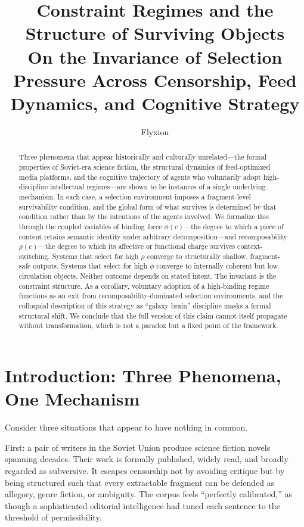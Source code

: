 \documentclass[12pt]{article}
\title{Constraint Regimes and the Structure of Surviving Objects\\
\large On the Invariance of Selection Pressure Across Censorship, Feed Dynamics, and Cognitive Strategy}
\author{Flyxion}
\date{}
\newcommand{\bind}{\phi}
\newcommand{\recomp}{\rho}
\begin{document}
\maketitle

\begin{abstract}
Three phenomena that appear historically and culturally unrelated—the formal
properties of Soviet-era science fiction, the structural dynamics of feed-optimized
media platforms, and the cognitive trajectory of agents who voluntarily adopt
high-discipline intellectual regimes—are shown to be instances of a single
underlying mechanism. In each case, a selection environment imposes a
fragment-level survivability condition, and the global form of what survives is
determined by that condition rather than by the intentions of the agents
involved. We formalize this through the coupled variables of binding force
$\bind(c)$—the degree to which a piece of content retains semantic identity
under arbitrary decomposition—and recomposability $\recomp(c)$—the degree
to which its affective or functional charge survives context-switching. Systems
that select for high $\recomp$ converge to structurally shallow, fragment-safe
outputs. Systems that select for high $\bind$ converge to internally coherent
but low-circulation objects. Neither outcome depends on stated intent. The
invariant is the constraint structure. As a corollary, voluntary adoption of a
high-binding regime functions as an exit from recomposability-dominated
selection environments, and the colloquial description of this strategy as
``galaxy brain'' discipline masks a formal structural shift. We conclude that
the full version of this claim cannot itself propagate without transformation,
which is not a paradox but a fixed point of the framework.
\end{abstract}

\tableofcontents
\clearpage

\section{Introduction: Three Phenomena, One Mechanism}
\label{sec:intro}

Consider three situations that appear to have nothing in common.

First: a pair of writers in the Soviet Union produce science fiction novels
spanning decades. Their work is formally published, widely read, and broadly
regarded as subversive. It escapes censorship not by avoiding critique but by
being structured such that every extractable fragment can be defended as
allegory, genre fiction, or ambiguity. The corpus feels ``perfectly calibrated,''
as though a sophisticated editorial intelligence had tuned each sentence to
the threshold of permissibility.
\end{document}
